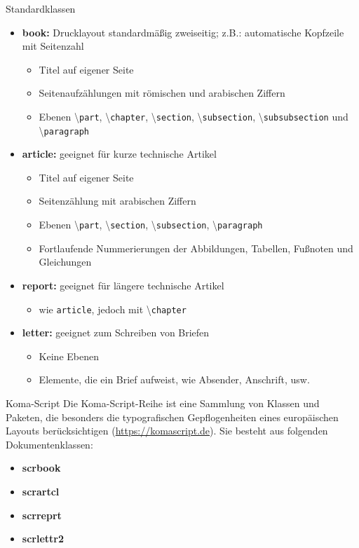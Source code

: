 \begin{frame}{Standardklassen}
\begin{itemize}
	\item \textbf{book:} Drucklayout standardmä{\ss}ig zweiseitig; z.B.: automatische Kopfzeile mit Seitenzahl
	\begin{itemize}
		\item Titel auf eigener Seite
		\item Seitenaufzählungen mit römischen und arabischen Ziffern
		\item Ebenen \textbackslash\texttt{part}, \textbackslash\texttt{chapter}, \textbackslash\texttt{section}, \textbackslash\texttt{subsection}, \textbackslash\texttt{subsubsection} und \textbackslash\texttt{paragraph}
	\end{itemize}
\item \textbf{article:} geeignet für kurze technische Artikel
	\begin{itemize}
		\item Titel auf eigener Seite
		\item Seitenzählung mit arabischen Ziffern
		\item Ebenen \textbackslash\texttt{part}, \textbackslash\texttt{section}, \textbackslash\texttt{subsection}, \textbackslash\texttt{paragraph}
		\item Fortlaufende Nummerierungen der Abbildungen, Tabellen, Fu{\ss}noten und Gleichungen
	\end{itemize}
\item \textbf{report:} geeignet für längere technische Artikel
	\begin{itemize}
		\item wie \texttt{article}, jedoch mit \textbackslash\texttt{chapter}
	\end{itemize}
\item \textbf{letter:} geeignet zum Schreiben von Briefen
	\begin{itemize}
		\item Keine Ebenen
		\item Elemente, die ein Brief aufweist, wie Absender, Anschrift, usw.
	\end{itemize}
\end{itemize}
\end{frame}

\begin{frame}{Koma-Script}
	Die Koma-Script-Reihe ist eine Sammlung von Klassen und Paketen, die besonders die typografischen Gepflogenheiten eines europäischen Layouts berücksichtigen (\url{https://komascript.de}). Sie besteht aus folgenden Dokumentenklassen: \\
	\begin{itemize}
		\item \textbf{scrbook}
		\item \textbf{scrartcl}
		\item \textbf{scrreprt}
		\item \textbf{scrlettr2}
	\end{itemize}

\end{frame}

